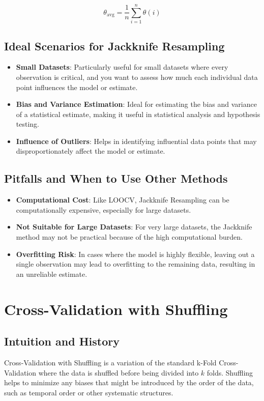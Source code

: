 \documentclass[10pt]{article}
\begin{document}
\[
\theta_{\text{avg}} = \frac{1}{n} \sum_{i=1}^{n} \theta(i)
\]

\subsection{Ideal Scenarios for Jackknife Resampling}
\begin{itemize}
    \item \textbf{Small Datasets}: Particularly useful for small datasets where every observation is critical, and you want to assess how much each individual data point influences the model or estimate.
    \item \textbf{Bias and Variance Estimation}: Ideal for estimating the bias and variance of a statistical estimate, making it useful in statistical analysis and hypothesis testing.
    \item \textbf{Influence of Outliers}: Helps in identifying influential data points that may disproportionately affect the model or estimate.
\end{itemize}

\subsection{Pitfalls and When to Use Other Methods}
\begin{itemize}
    \item \textbf{Computational Cost}: Like LOOCV, Jackknife Resampling can be computationally expensive, especially for large datasets.
    \item \textbf{Not Suitable for Large Datasets}: For very large datasets, the Jackknife method may not be practical because of the high computational burden.
    \item \textbf{Overfitting Risk}: In cases where the model is highly flexible, leaving out a single observation may lead to overfitting to the remaining data, resulting in an unreliable estimate.
\end{itemize}

\section{Cross-Validation with Shuffling}
\subsection{Intuition and History}
Cross-Validation with Shuffling is a variation of the standard k-Fold Cross-Validation where the data is shuffled before being divided into \(k\) folds. Shuffling helps to minimize any biases that might be introduced by the order of the data, such as temporal order or other systematic structures.
\end{document}
